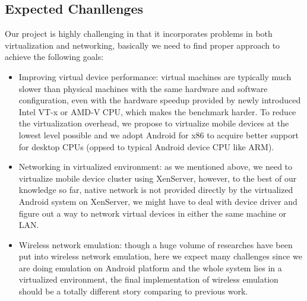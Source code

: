 \documentclass[journal,comsoc]{IEEEtran}
\begin{document}
\subsection{Expected Chanllenges}
Our project is highly challenging in that it incorporates problems in both virtualization and networking, basically we need to find proper approach to achieve the following goals:
\begin{itemize}
	\item Improving virtual device performance: virtual machines are typically much slower than physical machines with the same hardware and software configuration, even with the hardware speedup provided by newly introduced Intel VT-x or AMD-V CPU, which makes the benchmark harder. To reduce the virtualization overhead, we propose to virtualize mobile devices at the lowest level possible and we adopt Android for x86 to acquire better support for desktop CPUs (oppsed to typical Android device CPU like ARM).
	\item Networking in virtualized environment: as we mentioned above, we need to virtualize mobile device cluster using XenServer, however, to the best of our knowledge so far, native network is not provided directly by the virtualized Android system on XenServer, we might have to deal with device driver and figure out a way to network virtual devices in either the same machine or LAN.
	\item Wireless network emulation: though a huge volume of researches have been put into wireless network emulation, here we expect many challenges since we are doing emulation on Android platform and the whole system lies in a virtualized environment, the final implementation of wireless emulation should be a totally different story comparing to previous work.
\end{itemize}
\ifCLASSOPTIONcaptionsoff
  \newpage
\fi





%
%
%


\end{document}
